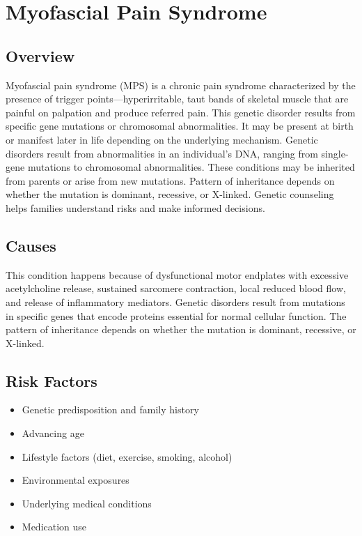 \chapter{Myofascial Pain Syndrome}
\label{sec:Myofascial Pain Syndrome}

\section{Overview}
Myofascial pain syndrome (MPS) is a chronic pain syndrome characterized by the presence of trigger points---hyperirritable, taut bands of skeletal muscle that are painful on palpation and produce referred pain. This genetic disorder results from specific gene mutations or chromosomal abnormalities. It may be present at birth or manifest later in life depending on the underlying mechanism. Genetic disorders result from abnormalities in an individual's DNA, ranging from single-gene mutations to chromosomal abnormalities. These conditions may be inherited from parents or arise from new mutations. Pattern of inheritance depends on whether the mutation is dominant, recessive, or X-linked. Genetic counseling helps families understand risks and make informed decisions.
\section{Causes}
This condition happens because of dysfunctional motor endplates with excessive acetylcholine release, sustained sarcomere contraction, local reduced blood flow, and release of inflammatory mediators. Genetic disorders result from mutations in specific genes that encode proteins essential for normal cellular function. The pattern of inheritance depends on whether the mutation is dominant, recessive, or X-linked.   
\section{Risk Factors}

\begin{itemize}[noitemsep]
  \item Genetic predisposition and family history
  \item Advancing age
  \item Lifestyle factors (diet, exercise, smoking, alcohol)
  \item Environmental exposures
  \item Underlying medical conditions
  \item Medication use
\end{itemize}
